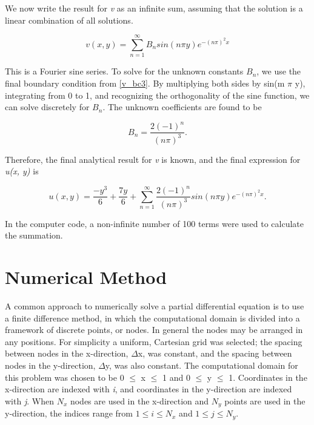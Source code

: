 \documentclass[10pt]{article}
\begin{document}
We now write the result for \textit{v} as an infinite sum, assuming that the solution is a linear combination of all solutions.

\vspace{-5pt}
\begin{equation}
v(x, y) = \sum_{n=1}^{\infty} B_n sin(n \pi y)e^{-(n \pi) ^2 x}
\end{equation}

This is a Fourier sine series. To solve for the unknown constants \textit{$B_n$}, we use the final boundary condition from \eqref{v_bc3}. By multiplying both sides by sin(m $\pi$ y), integrating from 0 to 1, and recognizing the orthogonality of the sine function, we can solve discretely for $B_n$. The unknown coefficients are found to be


\begin{equation}
B_n = \frac{2(-1)^n}{(n \pi)^3}.
\end{equation}

Therefore, the final analytical result for \textit{v} is known, and the final expression for \textit{u(x, y)} is


\begin{equation}
u(x, y) = \frac{-y^3}{6} + \frac{7y}{6} + \sum_{n=1}^{\infty} \frac{2(-1)^n}{(n \pi)^3} sin(n \pi y)e^{-(n \pi) ^2 x}.
\end{equation}

In the computer code, a non-infinite number of 100 terms were used to calculate the summation.

\section*{Numerical Method}
\vspace{-8pt}
A common approach to numerically solve a partial differential equation is to use a finite difference method, in which the computational domain is divided into a framework of discrete points, or nodes. In general the nodes may be arranged in any positions. \pagebreak For simplicity a uniform, Cartesian grid was selected; the spacing between nodes in the x-direction, $\Delta$x, was constant, and the spacing between nodes in the y-direction, $\Delta$y, was also constant. The computational domain for this problem was chosen to be 0 $\leq$ x $\leq$ 1 and 0 $\leq$ y $\leq$ 1. Coordinates in the x-direction are indexed with \textit{i}, and coordinates in the y-direction are indexed with \textit{j}. When \textit{$N_x$} nodes are used in the x-direction and \textit{$N_y$} points are used in the y-direction, the indices range from $1 \leq i \leq N_x$ and $1 \leq j \leq N_y$. \bigskip
\end{document}
